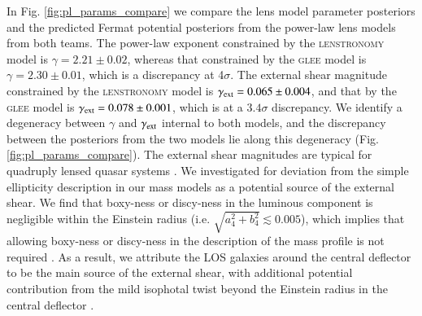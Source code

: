 \documentclass[longauth]{aa}
\newcommand{\reply}[1]{{{#1}}}
\begin{document}
In Fig. \ref{fig:pl_params_compare} we compare the lens model parameter posteriors and the predicted Fermat potential posteriors from the power-law lens models from both teams. The power-law exponent constrained by the \textsc{lenstronomy} model is $\gamma = 2.21\pm 0.02$, whereas that constrained by the \textsc{glee} model is $\gamma = 2.30 \pm 0.01$, which is a discrepancy at 4$\sigma$. The external shear magnitude constrained by the \textsc{lenstronomy} model is $\gamma_{\rm ext} = 0.065 \pm 0.004$, and that by the \textsc{glee} model is $\gamma_{\rm ext} = 0.078 \pm 0.001$, which is at a $3.4\sigma$ discrepancy. We identify a degeneracy between $\gamma$ and $\gamma_{\rm ext}$ internal to both models, and the discrepancy between the posteriors from the two models lie along this degeneracy (Fig. \ref{fig:pl_params_compare}). \reply{The external shear magnitudes are typical for quadruply lensed quasar systems \citep[e.g. see][]{Schmidt22}. We investigated for deviation from the simple ellipticity description in our mass models as a potential source of the external shear. We find that boxy-ness or discy-ness in the luminous component is negligible within the Einstein radius (i.e. $\sqrt{a_4^2 + b_4^2} \lesssim 0.005$), which implies that allowing boxy-ness or discy-ness in the description of the mass profile is not required \citep[for definitions of $a_4$ and $b_4$, and their impact on $H_0$ measurement, see][]{VandeVyvere22}. As a result, we attribute the LOS galaxies around the central deflector to be the main source of the external shear, with additional potential contribution from the mild isophotal twist beyond the Einstein radius in the central deflector \citep{VandeVyvere22b}.} %
\end{document}
